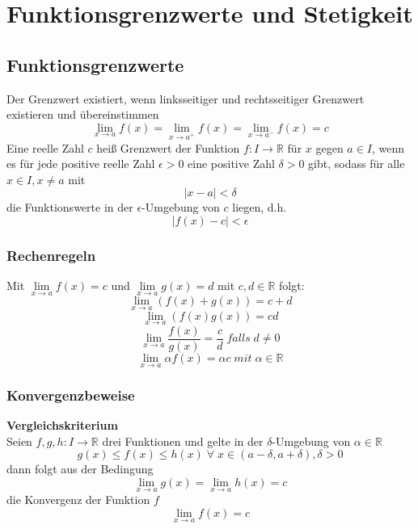 \documentclass[a4paper,twocolumn,10pt]{article}
\begin{document}
\section{Funktionsgrenzwerte und Stetigkeit}

\subsection{Funktionsgrenzwerte}
Der Grenzwert existiert, wenn linksseitiger und rechtsseitiger Grenzwert existieren und übereinstimmen
\begin{equation*}
\lim\limits_{x\rightarrow a}f(x)=\lim\limits_{x\rightarrow a^+}f(x)=\lim\limits_{x\rightarrow a^-}f(x)=c
\end{equation*}
Eine reelle Zahl $c$ heiß Grenzwert der Funktion $f:I\rightarrow\mathbb{R}$ für $x$ gegen $a\in I$, wenn es für jede positive reelle Zahl $\epsilon>0$ eine positive Zahl $\delta>0$ gibt, sodass für alle $x\in I, x\neq a$ mit
\begin{equation*}
|x-a|<\delta
\end{equation*}
die Funktionswerte in der $\epsilon$-Umgebung von $c$ liegen, d.h.
\begin{equation*}
|f(x)-c|<\epsilon
\end{equation*}

\subsubsection{Rechenregeln}
Mit $\lim\limits_{x\rightarrow a}f(x)=c$ und $\lim\limits_{x\rightarrow a}g(x)=d$ mit $c,d\in\mathbb{R}$ folgt:
\begin{equation*}
\lim\limits_{x\rightarrow a}(f(x)+g(x))=c+d
\end{equation*}
\begin{equation*}
\lim\limits_{x\rightarrow a}(f(x)g(x))=cd
\end{equation*}
\begin{equation*}
\lim\limits_{x\rightarrow a}\frac{f(x)}{g(x)}=\frac{c}{d}\;falls\;d\neq 0
\end{equation*}
\begin{equation*}
\lim\limits_{x\rightarrow a}\alpha f(x)=\alpha c\;mit\; \alpha\in\mathbb{R}
\end{equation*}

\subsubsection{Konvergenzbeweise}
\textbf{Vergleichskriterium}\\
Seien $f,g,h:I\rightarrow\mathbb{R}$ drei Funktionen und gelte in der $\delta$-Umgebung von $\alpha\in\mathbb{R}$
\begin{equation*}
g(x)\leq f(x)\leq h(x)\;\forall\;x\in(a-\delta , a+\delta),\delta >0
\end{equation*}
dann folgt aus der Bedingung
\begin{equation*}
\lim\limits_{x\rightarrow a}g(x)=\lim\limits_{x\rightarrow a}h(x)=c
\end{equation*}
die Konvergenz der Funktion $f$
\begin{equation*}
\lim\limits_{x\rightarrow a}f(x)=c
\end{equation*}
\end{document}
